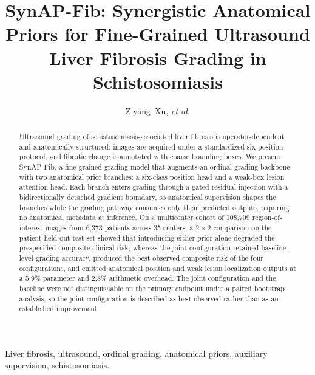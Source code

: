 \documentclass[journal]{IEEEtran}
\begin{document}
\title{SynAP-Fib: Synergistic Anatomical Priors for Fine-Grained Ultrasound
Liver Fibrosis Grading in Schistosomiasis}

\author{Ziyang~Xu, \textit{et al.}}

\maketitle

\begin{abstract}
Ultrasound grading of schistosomiasis-associated liver fibrosis is
operator-dependent and anatomically structured: images are acquired under a
standardized six-position protocol, and fibrotic change is annotated with
coarse bounding boxes. We present SynAP-Fib, a fine-grained grading model that
augments an ordinal grading backbone with two anatomical prior branches: a
six-class position head and a weak-box lesion attention head. Each branch
enters grading through a gated residual injection with a bidirectionally
detached gradient boundary, so anatomical supervision shapes the branches
while the grading pathway consumes only their predicted outputs, requiring no
anatomical metadata at inference. On a multicenter cohort of 108,709
region-of-interest images from 6,373 patients across 35 centers, a $2\times2$
comparison on the patient-held-out test set showed that introducing either
prior alone degraded the prespecified composite clinical risk, whereas the
joint configuration retained baseline-level grading accuracy, produced the
best observed composite risk of the four configurations, and emitted
anatomical position and weak lesion localization outputs at a 5.9\% parameter
and 2.8\% arithmetic overhead. The joint configuration and the baseline were
not distinguishable on the primary endpoint under a paired bootstrap analysis,
so the joint configuration is described as best observed rather than as an
established improvement.
\end{abstract}

\begin{IEEEkeywords}
Liver fibrosis, ultrasound, ordinal grading, anatomical priors, auxiliary
supervision, schistosomiasis.
\end{IEEEkeywords}






\end{document}
